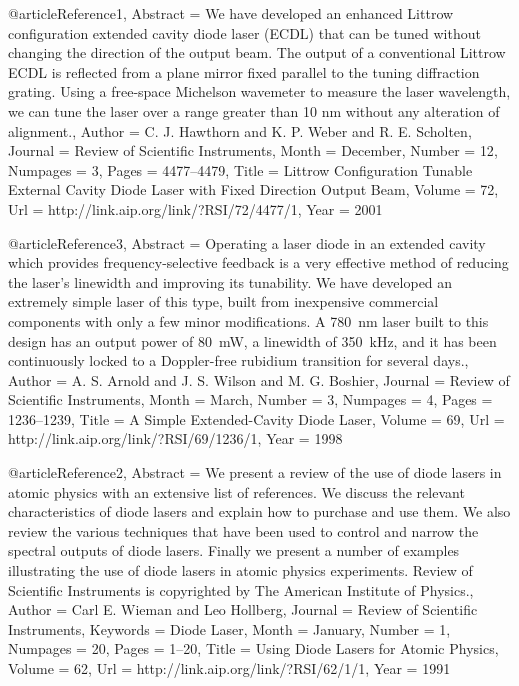@article{Reference1,
	Abstract = {We have developed an enhanced Littrow configuration extended cavity diode laser (ECDL) that can be tuned without changing the direction of the output beam. The output of a conventional Littrow ECDL is reflected from a plane mirror fixed parallel to the tuning diffraction grating. Using a free-space Michelson wavemeter to measure the laser wavelength, we can tune the laser over a range greater than 10 nm without any alteration of alignment.},
	Author = {C. J. Hawthorn and K. P. Weber and R. E. Scholten},
	Journal = {Review of Scientific Instruments},
	Month = {December},
	Number = {12},
	Numpages = {3},
	Pages = {4477--4479},
	Title = {Littrow Configuration Tunable External Cavity Diode Laser with Fixed Direction Output Beam},
	Volume = {72},
	Url = {http://link.aip.org/link/?RSI/72/4477/1},
	Year = {2001}}

@article{Reference3,
	Abstract = {Operating a laser diode in an extended cavity which provides frequency-selective feedback is a very effective method of reducing the laser's linewidth and improving its tunability. We have developed an extremely simple laser of this type, built from inexpensive commercial components with only a few minor modifications. A 780~nm laser built to this design has an output power of 80~mW, a linewidth of 350~kHz, and it has been continuously locked to a Doppler-free rubidium transition for several days.},
	Author = {A. S. Arnold and J. S. Wilson and M. G. Boshier},
	Journal = {Review of Scientific Instruments},
	Month = {March},
	Number = {3},
	Numpages = {4},
	Pages = {1236--1239},
	Title = {A Simple Extended-Cavity Diode Laser},
	Volume = {69},
	Url = {http://link.aip.org/link/?RSI/69/1236/1},
	Year = {1998}}

@article{Reference2,
	Abstract = {We present a review of the use of diode lasers in atomic physics with an extensive list of references. We discuss the relevant characteristics of diode lasers and explain how to purchase and use them. We also review the various techniques that have been used to control and narrow the spectral outputs of diode lasers. Finally we present a number of examples illustrating the use of diode lasers in atomic physics experiments. Review of Scientific Instruments is copyrighted by The American Institute of Physics.},
	Author = {Carl E. Wieman and Leo Hollberg},
	Journal = {Review of Scientific Instruments},
	Keywords = {Diode Laser},
	Month = {January},
	Number = {1},
	Numpages = {20},
	Pages = {1--20},
	Title = {Using Diode Lasers for Atomic Physics},
	Volume = {62},
	Url = {http://link.aip.org/link/?RSI/62/1/1},
	Year = {1991}}